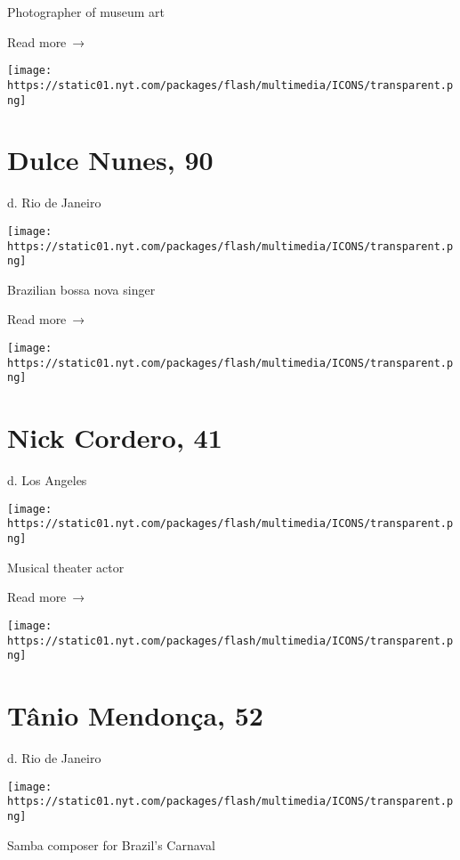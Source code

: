Photographer of museum art

 Read more~→

\href{https://www.nytimes.com/2020/07/06/arts/dulce-nunes-dead-coronavirus.html}{}

\texttt{[image: https://static01.nyt.com/packages/flash/multimedia/ICONS/transparent.png]}

\hypertarget{dulce-nunes-90}{%
\section{Dulce Nunes, 90}\label{dulce-nunes-90}}

d. Rio de Janeiro

\texttt{[image: https://static01.nyt.com/packages/flash/multimedia/ICONS/transparent.png]}

Brazilian bossa nova singer

 Read more~→

\href{https://www.nytimes.com/2020/07/05/obituaries/nick-cordero-dead-coronavirus.html}{}

\texttt{[image: https://static01.nyt.com/packages/flash/multimedia/ICONS/transparent.png]}

\hypertarget{nick-cordero-41}{%
\section{Nick Cordero, 41}\label{nick-cordero-41}}

d. Los Angeles

\texttt{[image: https://static01.nyt.com/packages/flash/multimedia/ICONS/transparent.png]}

Musical theater actor

 Read more~→

\href{https://www.nytimes.com/2020/07/03/obituaries/tanio-mendonca-dead-coronavirus.html}{}

\texttt{[image: https://static01.nyt.com/packages/flash/multimedia/ICONS/transparent.png]}

\hypertarget{tuxe2nio-mendonuxe7a-52}{%
\section{Tânio Mendonça, 52}\label{tuxe2nio-mendonuxe7a-52}}

d. Rio de Janeiro

\texttt{[image: https://static01.nyt.com/packages/flash/multimedia/ICONS/transparent.png]}

Samba composer for Brazil's Carnaval

